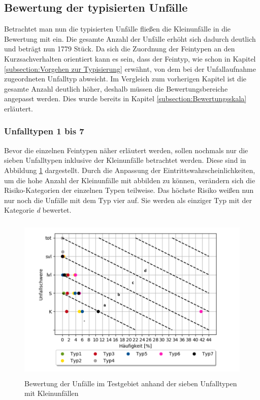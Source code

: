 \subsection{Bewertung der typisierten Unfälle}
Betrachtet man nun die typisierten Unfälle fließen die Kleinunfälle in die Bewertung mit ein. Die gesamte Anzahl der Unfälle erhöht sich dadurch deutlich und beträgt nun 1779 Stück. Da sich die Zuordnung der Feintypen an den Kurzsachverhalten orientiert kann es sein, dass der Feintyp, wie schon in Kapitel \ref{subsection:Vorgehen zur Typisierung} erwähnt, von dem bei der Unfallaufnahme zugeordneten Unfalltyp abweicht. Im Vergleich zum vorherigen Kapitel ist die gesamte Anzahl deutlich höher, deshalb müssen die Bewertungsbereiche angepasst werden. Dies wurde bereits in Kapitel \ref{subsection:Bewertungsskala} erläutert.

\subsubsection{Unfalltypen 1 bis 7}
Bevor die einzelnen Feintypen näher erläutert werden, sollen nochmals nur die sieben Unfalltypen inklusive der Kleinunfälle betrachtet werden. Diese sind in Abbildung \ref{fig:Bewertung_UTF} dargestellt. Durch die Anpassung der Eintrittswahrscheinlichkeiten, um die hohe Anzahl der Kleinunfälle mit abbilden zu können, verändern sich die Risiko-Kategorien der einzelnen Typen teilweise. Das höchste Risiko weißen nun nur noch die Unfälle mit dem Typ vier auf. Sie werden als einziger Typ mit der Kategorie \textit{d} bewertet.

\begin{savenotes}
	\begin{figure}[H]
		\centering
		\includegraphics[width=12cm,height=8cm]{figures/Bewertung_UTF}
		\caption[Bewertung der Unfälle im Testgebiet anhand der sieben Unfalltypen mit Kleinunfällen]{Bewertung der Unfälle im Testgebiet anhand der sieben Unfalltypen mit Kleinunfällen}\label{fig:Bewertung_UTF}
	\end{figure}
\end{savenotes}

